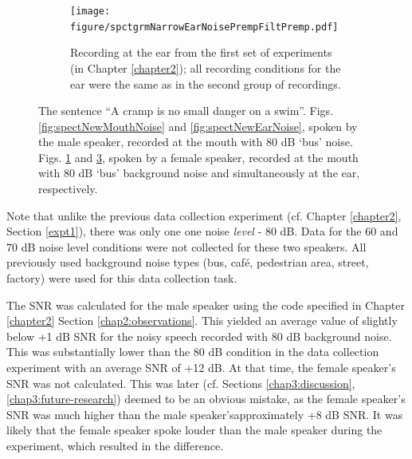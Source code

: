 \begin{figure}[h!]
\begin{subfigure}{0.45\textwidth}
  \label{fig:spectOldMouthNoise}
\end{subfigure}
\qquad
\begin{subfigure}{0.45\textwidth}
  \centering
  \texttt{[image: figure/spctgrmNarrowEarNoisePrempFiltPremp.pdf]}
  \caption{Recording at the ear from the first set of experiments (in Chapter \ref{chapter2}); all recording conditions for the ear were the same as in the second group of recordings.}
  \label{fig:spectOldEarNoise}
\end{subfigure}
\caption{The sentence ``A cramp is no small danger on a swim''. \DIFdelbeginFL {}\DIFdelendFL \DIFaddbeginFL {}\DIFaddendFL Figs. \ref{fig:spectNewMouthNoise} and \ref{fig:spectNewEarNoise}, spoken by the male speaker, recorded at the mouth \DIFaddbeginFL {}\DIFaddendFL with 80 dB `bus' \DIFaddbeginFL {}\DIFaddendFL noise\DIFdelbeginFL {}\DIFdelendFL .  \DIFdelbeginFL {}\DIFdelendFL \DIFaddbeginFL {}\DIFaddendFL Figs. \ref{fig:spectOldMouthNoise} and \ref{fig:spectOldEarNoise}, spoken by a female speaker, recorded at the mouth with 80 dB `bus' background noise and simultaneously at the ear, respectively.}
\end{figure}

Note that unlike the previous data collection experiment (cf. Chapter \ref{chapter2}, Section \ref{expt1}), there was only one one noise \textit{level} - 80 dB.  Data for the 60 and 70 dB noise level conditions were not collected for these two speakers.  All previously used background noise types (bus, caf\'{e}, pedestrian area, street, factory) were used for this data collection task\DIFdelbegin {}\DIFdelend .

The SNR was calculated for the male speaker using the code specified in Chapter \ref{chapter2} Section \ref{chap2:observations}.  This yielded an average value of slightly below +1 dB SNR for the noisy speech recorded with 80 dB background noise.  This was substantially lower than the 80 dB condition in the data collection experiment with an average SNR of +12 dB.  At that time, the female speaker's SNR was not calculated.  This was later (cf. Sections \ref{chap3:discussion}, \ref{chap3:future-research}) deemed to be an obvious mistake, as the female speaker's SNR was much higher than the male speaker's\DIFdelbegin {}\DIFdelend \DIFaddbegin {}\DIFaddend approximately +8 dB SNR.  It was likely that the female speaker spoke louder than the male speaker during the experiment, which resulted in the difference.


